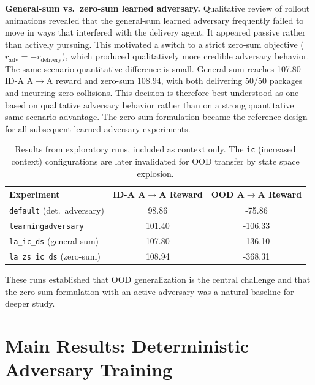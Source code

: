 \documentclass[sigconf]{aamas}
\DeclareRobustCommand{\codepath}[1]{\nolinkurl{#1}}
\begin{document}
\textbf{General-sum vs.\ zero-sum learned adversary.} Qualitative review of
rollout animations revealed that the general-sum learned adversary frequently
failed to move in ways that interfered with the delivery agent. It appeared
passive rather than actively pursuing. This motivated a switch to a strict
zero-sum objective ($r_\text{adv} = -r_\text{delivery}$), which produced
qualitatively more credible adversary behavior.
The same-scenario quantitative difference is small. General-sum
reaches 107.80 ID-A A$\to$A reward and zero-sum 108.94, with both delivering
50/50 packages and incurring zero collisions. This decision is therefore best
understood as one based on qualitative adversary behavior rather than on a
strong quantitative same-scenario advantage. The zero-sum formulation became the
reference design for all subsequent learned adversary experiments.

\begin{table}[t]
\caption{Results from exploratory runs, included as context only. The \codepath{ic} (increased context) configurations are
later invalidated for OOD transfer by state space explosion.}
\label{tab:early-core}
\centering
\footnotesize
\begin{tabular}{lcc}
\toprule
\textbf{Experiment} & \textbf{ID-A A$\to$A Reward} & \textbf{OOD A$\to$A Reward} \\
\midrule
\codepath{default} (det.\ adversary) & 98.86 & -75.86 \\
\codepath{learningadversary}         & 101.40 & -106.33 \\
\codepath{la_ic_ds} (general-sum)  & 107.80 & -136.10  \\
\codepath{la_zs_ic_ds} (zero-sum) & 108.94 & -368.31 \\
\bottomrule
\end{tabular}
\end{table}

These runs established that OOD generalization is the central challenge and that
the zero-sum formulation with an active adversary was a natural baseline for
deeper study.

\section{Main Results: Deterministic Adversary Training}
\label{sec:main}
\end{document}
